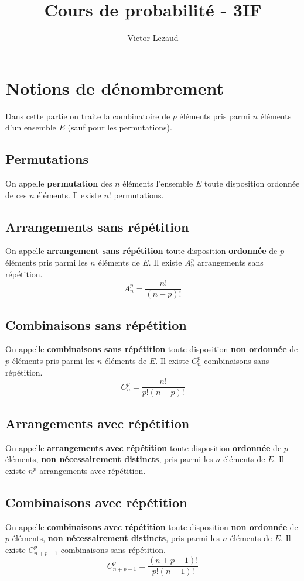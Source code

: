 \documentclass[10pt,a4paper,twoside]{article}
\author{Victor Lezaud}
\title{Cours de probabilité - 3IF}
\begin{document}
\maketitle
\renewcommand{\contentsname}{Sommaire}
\tableofcontents
\newpage

\section{Notions de dénombrement}
Dans cette partie on traite la combinatoire de $p$ éléments pris parmi $n$ éléments d'un ensemble $E$ (sauf pour les permutations).
\subsection{Permutations}
On appelle \textbf{permutation} des $n$ éléments l'ensemble $E$ toute disposition ordonnée de ces $n$ éléments. Il existe $n!$ permutations.

\subsection{Arrangements sans répétition}
On appelle \textbf{arrangement sans répétition} toute disposition \textbf{ordonnée} de $p$ éléments pris parmi les $n$ éléments de $E$. Il existe $A_{n}^{p}$ arrangements sans répétition.
$$A_{n}^{p}=\frac{n!}{(n-p)!}$$

\subsection{Combinaisons sans répétition}
On appelle \textbf{combinaisons sans répétition} toute disposition \textbf{non ordonnée} de $p$ éléments pris parmi les $n$ éléments de $E$. Il existe $C^{p}_{n}$ combinaisons sans répétition.
$$C^{p}_{n}=\frac{n!}{p!(n-p)!}$$


\subsection{Arrangements avec répétition}
On appelle \textbf{arrangements avec répétition} toute disposition \textbf{ordonnée} de $p$ éléments, \textbf{non nécessairement distincts}, pris parmi les $n$ éléments de $E$. Il existe $n^{p}$ arrangements avec répétition.

\subsection{Combinaisons avec répétition}
On appelle \textbf{combinaisons avec répétition} toute disposition \textbf{non ordonnée} de $p$ éléments, \textbf{non nécessairement distincts}, pris parmi les $n$ éléments de $E$. Il existe $C^{p}_{n+p-1}$ combinaisons sans répétition.
$$C^{p}_{n+p-1}=\frac{(n+p-1)!}{p!(n-1)!}$$
\end{document}
